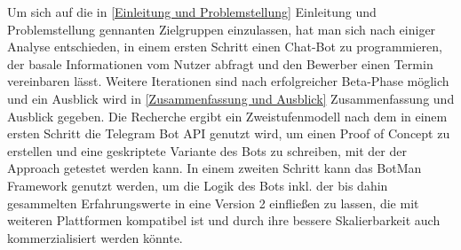 Um sich auf die in \ref{Einleitung und Problemstellung} Einleitung und Problemstellung gennanten Zielgruppen einzulassen, hat man sich nach einiger Analyse entschieden, in einem ersten Schritt einen Chat-Bot zu programmieren, der basale Informationen vom Nutzer abfragt und den Bewerber einen Termin vereinbaren lässt. Weitere Iterationen sind nach erfolgreicher Beta-Phase möglich und ein Ausblick wird in \ref{Zusammenfassung und Ausblick} Zusammenfassung und Ausblick gegeben. Die Recherche ergibt ein Zweistufenmodell nach dem in einem ersten Schritt die Telegram Bot API genutzt wird, um einen Proof of Concept zu erstellen und eine geskriptete Variante des Bots zu schreiben, mit der der Approach getestet werden kann. In einem zweiten Schritt kann das BotMan Framework genutzt werden, um die Logik des Bots inkl. der bis dahin gesammelten Erfahrungswerte in eine Version 2 einfließen zu lassen, die mit weiteren Plattformen kompatibel ist und durch ihre bessere Skalierbarkeit auch kommerzialisiert werden könnte. \\
